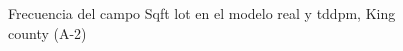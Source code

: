 \begin{figure}[H]
    \centering
    
    \caption{Frecuencia del campo Sqft lot en el modelo real y tddpm, King county (A-2)}
    \label{frecuency-tddpm-sqft lot}
\end{figure}